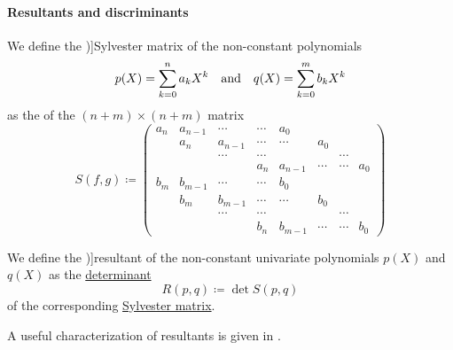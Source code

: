 \paragraph{Resultants and discriminants}

\begin{definition}\label{def:sylvester_matrix}
  We define the \term[ru=матрица Сильвестра, en=Sylvester matrix (\cite[def. 3.6.2]{CoxLittleOShea2015AlgGeometry})]{Sylvester matrix} of the non-constant polynomials
  \begin{align*}
    p(X) = \sum_{k=0}^n a_k X^k
    &&\T{and}&&
    q(X) = \sum_{k=0}^m b_k X^k
  \end{align*}
  as the  of the \( (n + m) \times (n + m) \) matrix
  \begin{equation*}
    S(f, g) \coloneqq
    \begin{pmatrix}
      a_n    & a_{n-1} & \cdots  & \cdots  & a_0     &        &        &        \\
             & a_n     & a_{n-1} & \cdots  & \cdots  & a_0    &        &        \\
             &         & \cdots  & \cdots  &         &        & \cdots &        \\
             &         &         & a_n     & a_{n-1} & \cdots & \cdots & a_0    \\
      b_m    & b_{m-1} & \cdots  & \cdots  & b_0     &        &        &        \\
             & b_m     & b_{m-1} & \cdots  & \cdots  & b_0    &        &        \\
             &         & \cdots  & \cdots  &         &        & \cdots &        \\
             &         &         & b_n     & b_{m-1} & \cdots & \cdots & b_0
    \end{pmatrix}
  \end{equation*}
\end{definition}

\begin{definition}\label{def:resultant}
  We define the \term[ru=результанта, en=resultant (\cite[def. 3.6.2]{CoxLittleOShea2015AlgGeometry})]{resultant} of the non-constant univariate polynomials \( p(X) \) and \( q(X) \) as the \hyperref[def:determinant]{determinant}
  \begin{equation*}
    R(p, q) \coloneqq \det S(p, q)
  \end{equation*}
  of the corresponding \hyperref[def:sylvester_matrix]{Sylvester matrix}.
\end{definition}
\begin{comments}
  \item A useful characterization of resultants is given in .
\end{comments}

